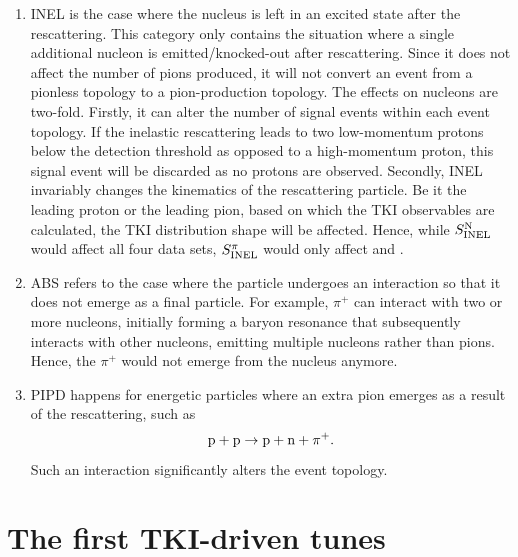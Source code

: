 \begin{enumerate}
\begin{enumerate}
\item 
INEL is the case where the nucleus is left in an excited state after the rescattering. This category only contains the situation where a single additional nucleon is emitted/knocked-out after rescattering. Since it does not affect the number of pions produced, it will not convert an event from a pionless topology to a pion-production topology. The effects on nucleons are two-fold. Firstly, it can alter the number of signal events within each event topology. If the inelastic rescattering leads to two low-momentum protons below the detection threshold as opposed to a high-momentum proton, this signal event will be discarded as no protons are observed. Secondly, INEL invariably changes the kinematics of the rescattering particle. Be it the leading proton or the leading pion, based on which the TKI observables are calculated, the TKI distribution shape will be affected. Hence, while $S_\textrm{INEL}^\textrm{N}$ would affect all four data sets, $S_\textrm{INEL}^{\pi}$ would only affect \ttkpip and \minpiz. 

\item 
ABS refers to the case where the particle undergoes an interaction so that it does not emerge as a final particle. For example, $\pi^+$ can interact with two or more nucleons, initially forming a baryon resonance that subsequently interacts with other nucleons, emitting multiple nucleons rather than pions. Hence, the $\pi^+$ would not emerge from the nucleus anymore.

\item 
PIPD happens for energetic particles where an extra pion emerges as a result of the rescattering, such as
\begin{equation}
    \textrm{p} + \textrm{p} \rightarrow \textrm{p} + \textrm{n} + \pi^+.
\end{equation}
Such an interaction significantly alters the event topology. 

\end{enumerate}
\end{enumerate}

\section{\label{sec:results}The first TKI-driven \genie tunes}


